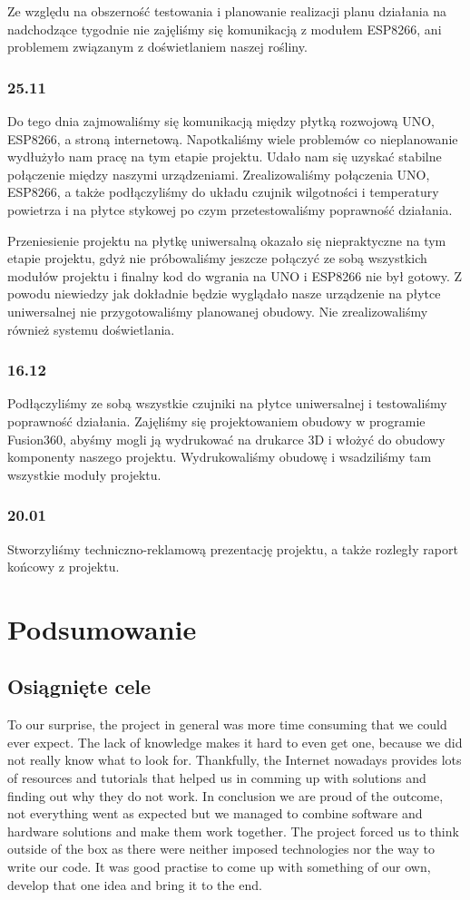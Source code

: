\documentclass[12pt]{article}
\begin{document}
Ze względu na obszerność testowania i planowanie realizacji planu działania na nadchodzące tygodnie nie zajęliśmy się komunikacją z modułem ESP8266, ani problemem związanym z doświetlaniem naszej rośliny.


\subsubsection{25.11}
Do tego dnia zajmowaliśmy się komunikacją między płytką rozwojową UNO, ESP8266, a stroną internetową. Napotkaliśmy wiele problemów co nieplanowanie wydłużyło nam pracę na tym etapie projektu. Udało nam się uzyskać stabilne połączenie między naszymi urządzeniami. Zrealizowaliśmy połączenia UNO, ESP8266, a także podłączyliśmy do układu czujnik wilgotności i temperatury powietrza i na płytce stykowej po czym przetestowaliśmy poprawność działania. 

Przeniesienie projektu na płytkę uniwersalną okazało się niepraktyczne na tym etapie projektu, gdyż nie próbowaliśmy jeszcze połączyć ze sobą wszystkich modułów projektu i finalny kod do wgrania na UNO i ESP8266 nie był gotowy. Z powodu niewiedzy jak dokładnie będzie wyglądało nasze urządzenie na płytce uniwersalnej nie przygotowaliśmy planowanej obudowy. Nie zrealizowaliśmy również systemu doświetlania.

\subsubsection{16.12}
Podłączyliśmy ze sobą wszystkie czujniki na płytce uniwersalnej i testowaliśmy poprawność działania. Zajęliśmy się projektowaniem obudowy w programie Fusion360, abyśmy mogli ją wydrukować na drukarce 3D i włożyć do obudowy komponenty naszego projektu. Wydrukowaliśmy obudowę i wsadziliśmy tam wszystkie moduły projektu.

\subsubsection{20.01}
Stworzyliśmy techniczno-reklamową prezentację projektu, a także rozległy raport końcowy z projektu. 


\newpage
\section{Podsumowanie }
\subsection{Osiągnięte cele}
To our surprise, the project in general was more time consuming that we could ever expect. The lack of knowledge makes it hard to even get one, because we did not really know what to look for. Thankfully, the Internet nowadays provides lots of resources and tutorials that helped us in comming up with solutions and finding out why they do not work. In conclusion we are proud of the outcome, not everything went as expected but we managed to combine software and hardware solutions and make them work together. 
The project forced us to think outside of the box as there were neither imposed technologies nor the way to write our code. It was good practise to come up with something of our own, develop that one idea and bring it to the end.
\end{document}

